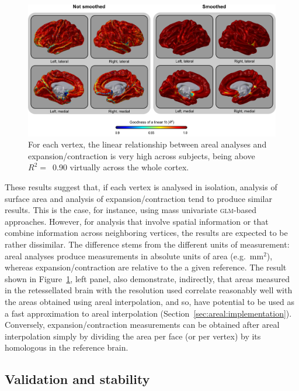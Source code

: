 \begin{figure}[!tp]  %
\centering
\includegraphics[width=14cm]{images/spatialfit.png}
\caption[Comparison with expansion/contraction methods (\textsc{iii}).]{For each vertex, the linear relationship between areal analyses and expansion/contraction is very high across subjects, being above $R^2=$~0.90 virtually across the whole cortex.}
\label{fig:areal:spatialfit}
\end{figure}

These results suggest that, if each vertex is analysed in isolation, analysis of surface area and analysis of expansion/contraction tend to produce similar results. This is the case, for instance, using mass univariate \textsc{glm}-based approaches. However, for analysis that involve spatial information or that combine information across neighboring vertices, the results are expected to be rather dissimilar. The difference stems from the different units of measurement: areal analyses produce measurements in absolute units of area (e.g.\ mm$^2$), whereas expansion/contraction are relative to the a given reference. The result shown in Figure~\ref{fig:areal:spatialfit}, left panel, also demonstrate, indirectly, that areas measured in the retessellated brain with the resolution used correlate reasonably well with the areas obtained using areal interpolation, and so, have potential to be used as a fast approximation to areal interpolation (Section~\ref{sec:areal:implementation}). Conversely, expansion/contraction measurements can be obtained after areal interpolation simply by dividing the area per face (or per vertex) by its homologous in the reference brain.

\subsection{Validation and stability}

